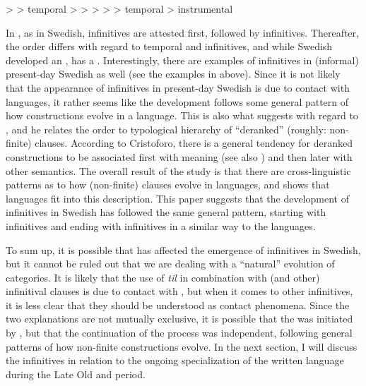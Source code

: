 \documentclass[output=paper]{langscibook}
\begin{document}
\ea
\label{ex:kalm:31}
 >  > temporal >  > 
\ex
\label{ex:kalm:32}
 >  >  > temporal > instrumental
\z

In , as in Swedish,  infinitives are attested first, followed by  infinitives. Thereafter, the order differs with regard to temporal and  infinitives, and while Swedish developed an ,  has a . Interestingly, there are examples of  infinitives in (informal) present-day Swedish as well (see the examples in  above). Since it is not likely that the appearance of  infinitives in present-day Swedish is due to contact with  languages, it rather seems like the development follows some general pattern of how  constructions evolve in a language. This is also what \citet{Schulte2007Prepositional, Schulte2007What} suggests with regard to , and he relates the order to  typological hierarchy of “deranked” (roughly: non-finite)  clauses. According to Cristoforo, there is a general tendency for deranked constructions to be associated first with  meaning (see also \citealt{Haspelmath1989}) and then later with other semantics. The overall result of the study is that there are cross-linguistic patterns as to how  (non-finite) clauses evolve in languages, and \citet{Schulte2007Prepositional, Schulte2007What} shows that  languages fit into this description. This paper suggests that the development of  infinitives in Swedish has followed the same general pattern, starting with  infinitives and ending with  infinitives in a similar way to the  languages.



To sum up, it is possible that  has affected the emergence of  infinitives in Swedish, but it cannot be ruled out that we are dealing with a “natural” evolution of  categories. It is likely that the use of \textit{til} in combination with  (and other) infinitival clauses is due to contact with , but when it comes to other  infinitives, it is less clear that they should be understood as contact phenomena. Since the two explanations are not mutually exclusive, it is possible that the  was initiated by , but that the continuation of the process was independent, following general patterns of how  non-finite constructions evolve. In the next section, I will discuss the  infinitives in relation to the ongoing specialization of the written language during the Late Old and  period. 
\end{document}
